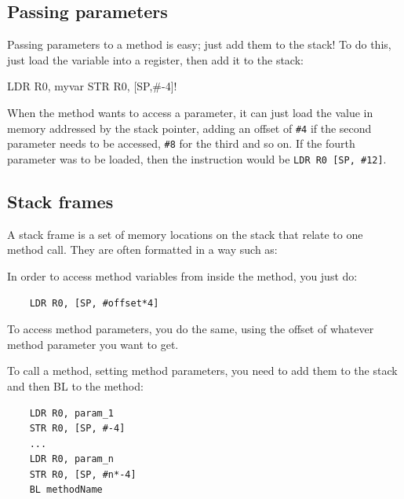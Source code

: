 
\subsection{Passing parameters}

Passing parameters to a method is easy; just add them to the stack! To do this,
just load the variable into a register, then add it to the stack:

\begin{listing}{1}
	LDR 	R0, myvar
	STR 	R0, [SP,#-4]!
\end{listing}

When the method wants to access a parameter, it can just load the value in
memory addressed by the stack pointer, adding an offset of {\tt \#4} if the
second parameter needs to be accessed, {\tt \#8} for the third and so on. If the
fourth parameter was to be loaded, then the instruction would be {\tt LDR R0
[SP, \#12]}.

\subsection{Stack frames}

A stack frame is a set of memory locations on the stack that relate to one
method call. They are often formatted in a way such as:

\begin{center}
\begin{drawstack}
		
\end{drawstack}
\end{center}

In order to access method variables from inside the method, you just do:

\begin{verbatim}
	LDR	R0, [SP, #offset*4]
\end{verbatim}

To access method parameters, you do the same, using the offset of whatever
method parameter you want to get.

To call a method, setting method parameters, you need to add them to the stack
and then BL to the method:

\begin{verbatim}
	LDR R0, param_1
	STR R0, [SP, #-4]
	...
	LDR R0, param_n
	STR R0, [SP, #n*-4]
	BL methodName
\end{verbatim}

